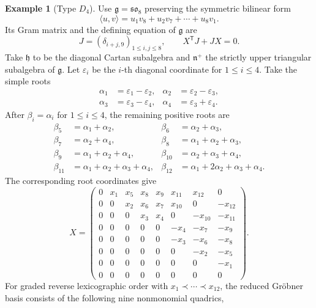 \documentclass[12pt]{article}
\theoremstyle{definition}
\newtheorem{example}[theorem]{Example}
\newcommand{\g}{\mathfrak g}
\newcommand{\h}{\mathfrak h}
\newcommand{\n}{\mathfrak n^{+}}
\begin{document}
\begin{example}[Type $D_4$]
    Use $\g=\mathfrak{so}_8$ preserving the symmetric bilinear form
    $$
        \langle u,v\rangle=u_1v_8+u_2v_7+\cdots+u_8v_1.
    $$
    Its Gram matrix and the defining equation of $\g$ are
    $$
        J=(\delta_{i+j,9})_{1\leq i,j\leq8},\qquad X^{\mathsf T}J+JX=0.
    $$
    Take $\h$ to be the diagonal Cartan subalgebra and $\n$ the strictly upper triangular subalgebra of $\g$. Let $\varepsilon_i$ be the $i$-th diagonal coordinate for $1\leq i\leq4$. Take the simple roots
    \begin{align*}
        \alpha_1&=\varepsilon_1-\varepsilon_2,
        &\alpha_2&=\varepsilon_2-\varepsilon_3,\\
        \alpha_3&=\varepsilon_3-\varepsilon_4,
        &\alpha_4&=\varepsilon_3+\varepsilon_4.
    \end{align*}
    After $\beta_i=\alpha_i$ for $1\leq i\leq4$, the remaining positive roots are
    \begin{align*}
        \beta_5&=\alpha_1+\alpha_2,
        &\beta_6&=\alpha_2+\alpha_3,\\
        \beta_7&=\alpha_2+\alpha_4,
        &\beta_8&=\alpha_1+\alpha_2+\alpha_3,\\
        \beta_9&=\alpha_1+\alpha_2+\alpha_4,
        &\beta_{10}&=\alpha_2+\alpha_3+\alpha_4,\\
        \beta_{11}&=\alpha_1+\alpha_2+\alpha_3+\alpha_4,
        &\beta_{12}&=\alpha_1+2\alpha_2+\alpha_3+\alpha_4.
    \end{align*}
    The corresponding root coordinates give
    $$
        X=\begin{pmatrix}
            0&x_1&x_5&x_8&x_9&x_{11}&x_{12}&0\\
            0&0&x_2&x_6&x_7&x_{10}&0&-x_{12}\\
            0&0&0&x_3&x_4&0&-x_{10}&-x_{11}\\
            0&0&0&0&0&-x_4&-x_7&-x_9\\
            0&0&0&0&0&-x_3&-x_6&-x_8\\
            0&0&0&0&0&0&-x_2&-x_5\\
            0&0&0&0&0&0&0&-x_1\\
            0&0&0&0&0&0&0&0
        \end{pmatrix}.
    $$
    For graded reverse lexicographic order with $x_1\prec\cdots\prec x_{12}$, the reduced Gr\"obner basis consists of the following nine nonmonomial quadrics,
    \begin{align*}

\end{align*}
\end{example}
\end{document}
